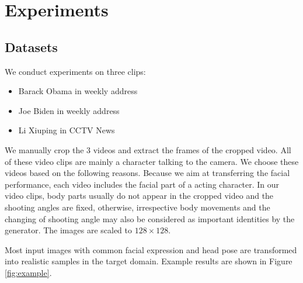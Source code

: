 \documentclass[letterpaper]{article} %
\begin{document}
	\section{Experiments} \label{Experiments}
	\subsection{Datasets}
	We conduct experiments on three clips:
	\begin{itemize}
		\item Barack Obama in weekly address%
		\item Joe Biden in weekly address%
		\item Li Xiuping in CCTV News%
	\end{itemize}
	
	We manually crop the 3 videos and extract the frames of the cropped video. All of these video clips are mainly a character talking to the camera. We choose these videos based on the following reasons. Because we aim at transferring the facial performance, each video includes the facial part of a acting character. In our video clips, body parts usually do not appear in the cropped video and the shooting angles are fixed, otherwise, irrespective body movements and the changing of shooting angle may also be considered as important identities by the generator. %
	The images are scaled to $128\times128$. %
	
	Most input images with common facial expression and head pose are transformed into realistic samples in the target domain. Example results are shown in Figure \ref{fig:example}.
	
	
	
\end{document}
